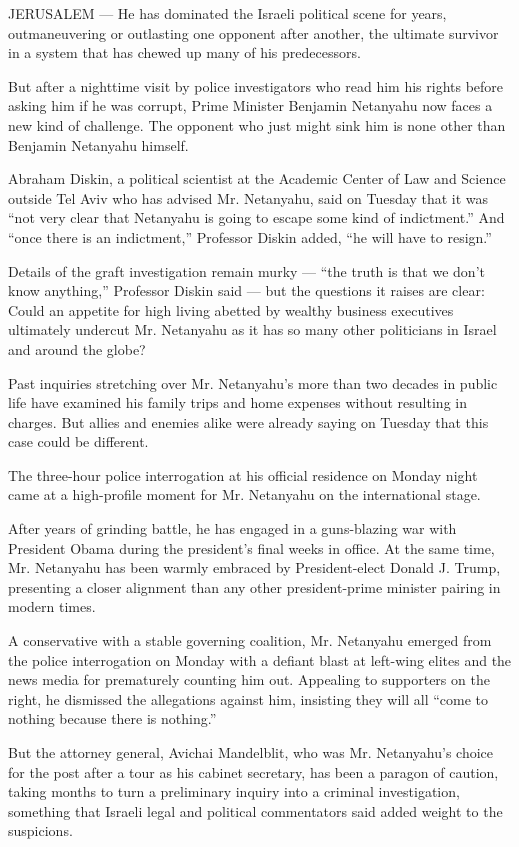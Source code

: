 JERUSALEM --- He has dominated the Israeli political scene for years,
outmaneuvering or outlasting one opponent after another, the ultimate
survivor in a system that has chewed up many of his predecessors.

But after a nighttime visit by police investigators who read him his
rights before asking him if he was corrupt, Prime Minister Benjamin
Netanyahu now faces a new kind of challenge. The opponent who just might
sink him is none other than Benjamin Netanyahu himself.

Abraham Diskin, a political scientist at the Academic Center of Law and
Science outside Tel Aviv who has advised Mr. Netanyahu, said on Tuesday
that it was ``not very clear that Netanyahu is going to escape some kind
of indictment.'' And ``once there is an indictment,'' Professor Diskin
added, ``he will have to resign.''

Details of the graft investigation remain murky --- ``the truth is that
we don't know anything,'' Professor Diskin said --- but the questions it
raises are clear: Could an appetite for high living abetted by wealthy
business executives ultimately undercut Mr. Netanyahu as it has so many
other politicians in Israel and around the globe?

Past inquiries stretching over Mr. Netanyahu's more than two decades in
public life have examined his family trips and home expenses without
resulting in charges. But allies and enemies alike were already saying
on Tuesday that this case could be different.

The three-hour police interrogation at his official residence on Monday
night came at a high-profile moment for Mr. Netanyahu on the
international stage.

After years of grinding battle, he has engaged in a guns-blazing war
with President Obama during the president's final weeks in office. At
the same time, Mr. Netanyahu has been warmly embraced by President-elect
Donald J. Trump, presenting a closer alignment than any other
president-prime minister pairing in modern times.

A conservative with a stable governing coalition, Mr. Netanyahu emerged
from the police interrogation on Monday with a defiant blast at
left-wing elites and the news media for prematurely counting him out.
Appealing to supporters on the right, he dismissed the allegations
against him, insisting they will all ``come to nothing because there is
nothing.''

But the attorney general, Avichai Mandelblit, who was Mr. Netanyahu's
choice for the post after a tour as his cabinet secretary, has been a
paragon of caution, taking months to turn a preliminary inquiry into a
criminal investigation, something that Israeli legal and political
commentators said added weight to the suspicions.

